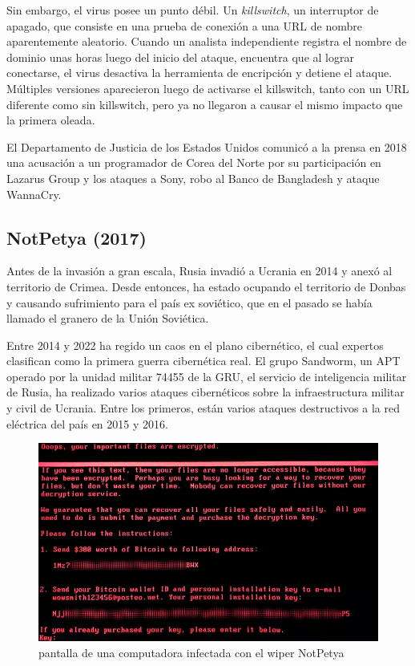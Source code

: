 \documentclass{article}
\begin{document}
Sin embargo, el virus posee un punto débil. Un {\it killswitch}, un interruptor de apagado, que consiste en una prueba de conexión a una URL de nombre aparentemente aleatorio. Cuando un analista independiente registra el nombre de dominio unas horas luego del inicio del ataque, encuentra que al lograr conectarse, el virus desactiva la herramienta de encripción y detiene el ataque. Múltiples versiones aparecieron luego de activarse el killswitch, tanto con un URL diferente como sin killswitch, pero ya no llegaron a causar el mismo impacto que la primera oleada. \autocite{darknetdiaries-wannacry}

El Departamento de Justicia de los Estados Unidos comunicó a la prensa en 2018 una acusación a un programador de Corea del Norte por su participación en Lazarus Group y los ataques a Sony, robo al Banco de Bangladesh y ataque WannaCry. \autocite{doj-lazarus}

\subsection{NotPetya (2017)}
Antes de la invasión a gran escala, Rusia invadió a Ucrania en 2014 y anexó al territorio de Crimea. Desde entonces, ha estado ocupando el territorio de Donbas y causando sufrimiento para el país ex soviético, que en el pasado se había llamado el granero de la Unión Soviética.

Entre 2014 y 2022 ha regido un caos en el plano cibernético, el cual expertos clasifican como la primera guerra cibernética real. El grupo Sandworm, un APT operado por la unidad militar 74455 de la GRU, el servicio de inteligencia militar de Rusia, ha realizado varios ataques cibernéticos sobre la infraestructura militar y civil de Ucrania. Entre los primeros, están varios ataques destructivos a la red eléctrica del país en 2015 y 2016. \autocite{doj-sandworm}

\begin{figure}[t]
    \centering
    \includegraphics[width=1.0\textwidth]{notPetya.png}
    \caption{pantalla de una computadora infectada con el wiper NotPetya}
    \label{fig:notpetya}
\end{figure}
\end{document}
